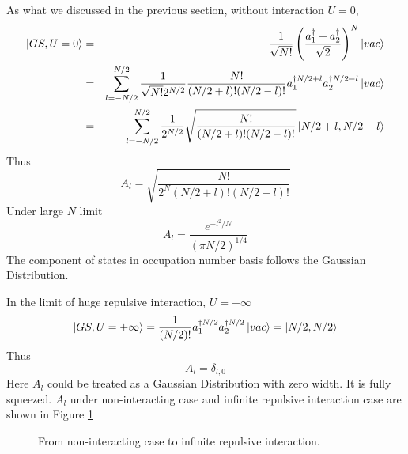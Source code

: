 As what we discussed in the previous section, without interaction $U=0$, 
\begin{eqnarray}
\ket{GS, U=0} &=&\frac{1}{\sqrt{N!}}\left(\frac{a_1^\dag+a_2^\dag}{\sqrt 2}\right)^N\ket {vac}\notag\\
&=& \sum_{l=-N/2}^{N/2} \frac{1}{\sqrt{N!} 2^{N/2}}\frac{N!}{(N/2+l)!(N/2-l)!} a_1^{\dag N/2+l} a_2^{\dag N/2-l}\ket{vac}\notag\\
&=& \sum_{l=-N/2}^{N/2} \frac{1}{2^{N/2}}\sqrt{\frac{N!}{(N/2+l)!(N/2-l)!}} \ket{N/2+l,N/2-l}\notag\\
\end{eqnarray}
Thus
\begin{equation}
A_l = \sqrt{\frac{N!}{2^{N}(N/2+l)!(N/2-l)!}}
\end{equation}
Under large $N$ limit
\begin{equation}
A_l =\frac{e^{-l^2/N}}{(\pi N/2)^{1/4}}
\end{equation}
The component of states in occupation number basis follows the Gaussian Distribution. 



In the limit of huge repulsive interaction, $U = +\infty$
\begin{equation}
\ket{GS,  U= +\infty} = \frac{1}{(N/2)!}a_1^{\dag N/2} a_2^{\dag N/2} \ket{vac} = \ket{N/2, N/2}
\end{equation}
Thus
\begin{equation}
A_l = \delta_{l,0}
\end{equation}
Here $A_l$ could be treated as a Gaussian Distribution with zero width.
It is fully squeezed. $A_l$ under non-interacting case and infinite repulsive interaction case are shown in Figure \ref{fig:1-8}

\begin{figure}[htbp]
\centering
{}
\caption{From non-interacting case to infinite repulsive interaction.}
\label{fig:1-8}
\end{figure}

